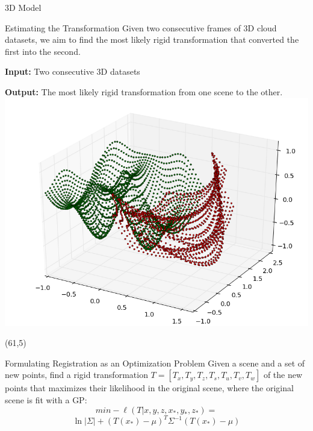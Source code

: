 \documentclass[final]{beamer}
\begin{document}
\begin{frame}{}
\begin{textblock}{27.5}
\begin{block}{3D Model}
\end{block}

\begin{block}{Estimating the Transformation}
Given two consecutive frames of 3D cloud datasets, we aim to find the most likely rigid transformation that converted the first into the second.

\textbf{Input:} Two consecutive 3D datasets

\textbf{Output:} The most likely rigid transformation from one scene to the other.
\includegraphics[width=10in]{3DWorldModel.png}
\end{block}

\end{textblock}

\begin{textblock}{27}(61,5)




\begin{block}{Formulating Registration as an Optimization Problem}
Given a scene and a set of new points, find a rigid transformation $T = [T_x,T_y,T_z,T_s,T_u,T_v,T_w]$ of the new points 
that maximizes their likelihood in the original scene, where the original scene is fit with a GP:
$$min -\ell(T|x,y,z,x_*,y_*,z_*) =$$
$$ \ln|\Sigma| + (T(x_*) - \mu)^T \Sigma^{-1} (T(x_*) - \mu)$$

\end{block}



\end{textblock}
\end{frame}
\end{document}
